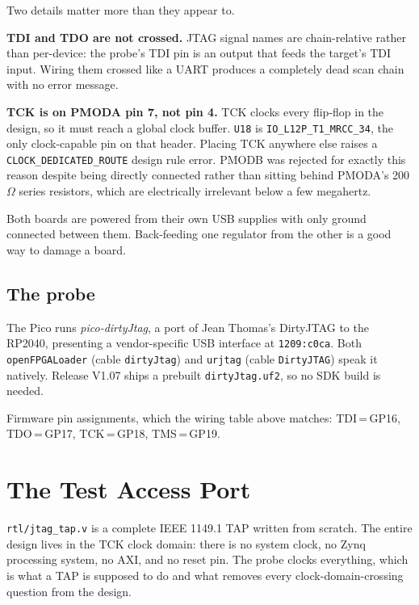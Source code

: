 \documentclass[11pt,a4paper]{article}
\newcommand{\file}[1]{\texttt{#1}}
\begin{document}
Two details matter more than they appear to.

\textbf{TDI and TDO are not crossed.} JTAG signal names are chain-relative
rather than per-device: the probe's TDI pin is an output that feeds the target's
TDI input. Wiring them crossed like a UART produces a completely dead scan chain
with no error message.

\textbf{TCK is on PMODA pin 7, not pin 4.} TCK clocks every flip-flop in the
design, so it must reach a global clock buffer. \texttt{U18} is
\texttt{IO\_L12P\_T1\_MRCC\_34}, the only clock-capable pin on that header.
Placing TCK anywhere else raises a \texttt{CLOCK\_DEDICATED\_ROUTE} design rule
error. PMODB was rejected for exactly this reason despite being directly
connected rather than sitting behind PMODA's 200\,$\Omega$ series resistors,
which are electrically irrelevant below a few megahertz.

Both boards are powered from their own USB supplies with only ground connected
between them. Back-feeding one regulator from the other is a good way to damage
a board.

\subsection{The probe}

The Pico runs \emph{pico-dirtyJtag}, a port of Jean Thomas's DirtyJTAG to the
RP2040, presenting a vendor-specific USB interface at \texttt{1209:c0ca}. Both
\texttt{openFPGALoader} (cable \texttt{dirtyJtag}) and \texttt{urjtag} (cable
\texttt{DirtyJTAG}) speak it natively. Release V1.07 ships a prebuilt
\file{dirtyJtag.uf2}, so no SDK build is needed.

Firmware pin assignments, which the wiring table above matches:
TDI\,=\,GP16, TDO\,=\,GP17, TCK\,=\,GP18, TMS\,=\,GP19.

\section{The Test Access Port}

\file{rtl/jtag\_tap.v} is a complete IEEE 1149.1 TAP written from scratch. The
entire design lives in the TCK clock domain: there is no system clock, no Zynq
processing system, no AXI, and no reset pin. The probe clocks everything, which
is what a TAP is supposed to do and what removes every clock-domain-crossing
question from the design.
\end{document}
